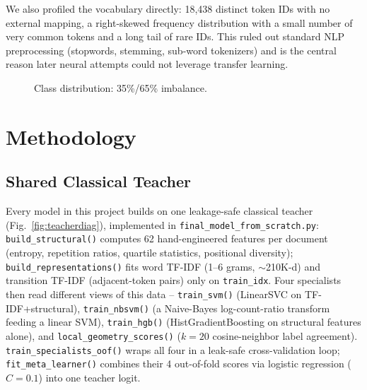 \documentclass[10pt,twocolumn]{article}
\begin{document}
We also profiled the vocabulary directly: 18{,}438 distinct token IDs with no external mapping, a right-skewed frequency distribution with a small number of very common tokens and a long tail of rare IDs. This ruled out standard NLP preprocessing (stopwords, stemming, sub-word tokenizers) and is the central reason later neural attempts could not leverage transfer learning.

\begin{figure}[!htb]
\centering
{}
\caption{Class distribution: 35\%/65\% imbalance.}
\label{fig:classdist}
\end{figure}

\section{Methodology}

\subsection{Shared Classical Teacher}
Every model in this project builds on one leakage-safe classical teacher (Fig.~\ref{fig:teacherdiag}), implemented in \texttt{final\_model\_from\_scratch.py}: \texttt{build\_structural()} computes 62 hand-engineered features per document (entropy, repetition ratios, quartile statistics, positional diversity); \texttt{build\_representations()} fits word TF-IDF (1--6 grams, $\sim$210K-d) and transition TF-IDF (adjacent-token pairs) only on \texttt{train\_idx}. Four specialists then read different views of this data -- \texttt{train\_svm()} (LinearSVC on TF-IDF+structural), \texttt{train\_nbsvm()} (a Naive-Bayes log-count-ratio transform feeding a linear SVM), \texttt{train\_hgb()} (HistGradientBoosting on structural features alone), and \texttt{local\_geometry\_scores()} ($k{=}20$ cosine-neighbor label agreement). \texttt{train\_specialists\_oof()} wraps all four in a leak-safe cross-validation loop; \texttt{fit\_meta\_learner()} combines their 4 out-of-fold scores via logistic regression ($C{=}0.1$) into one teacher logit.
\end{document}
